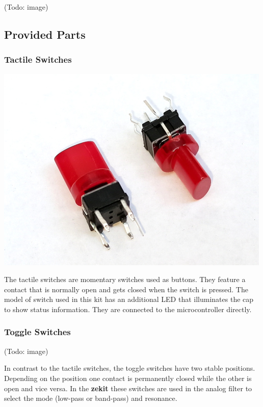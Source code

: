 \documentclass{scrartcl}
\begin{document}
\begin{center}
    (Todo: image)
\end{center}

\subsection{Provided Parts}

\subsubsection{Tactile Switches}

\begin{center}
    \includegraphics[scale=0.5]{assets/zekit-tacts-resized.jpg}
\end{center}

The tactile switches are momentary switches used as buttons. They feature a contact that is normally open and gets closed when the switch is pressed. The model of switch used in this kit has an additional LED that illuminates the cap to show status information. They are connected to the microcontroller directly.

\subsubsection{Toggle Switches}

\begin{center}
    (Todo: image)
\end{center}

In contrast to the tactile switches, the toggle switches have two stable positions. Depending on the position one contact is permanently closed while the other is open and vice versa. In the \textbf{zekit} these switches are used in the analog filter to select the mode (low-pass or band-pass) and resonance.
\end{document}
